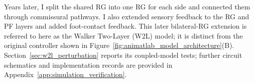 Years later, I split the shared RG into one RG for each side and connected them through commissural pathways. I also extended sensory feedback to the RG and PF layers and added foot-contact feedback. This later bilateral-RG extension is referred to here as the Walker Two-Layer (W2L) model; it is distinct from the original controller shown in Figure~\ref{fig:animatlab_model_architecture}(B). Section~\ref{sec:w2l_perturbation} reports its coupled-model tests; further circuit schematics and implementation records are provided in Appendix~\ref{app:simulation_verification}.
